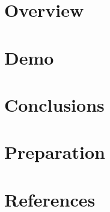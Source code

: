 \section[Overview]{Overview}


% 

% 

% 

\section[Demo]{Demo}


\section[Concl]{Conclusions}


\section[Prep]{Preparation}
% 


\section[Refs]{References}
